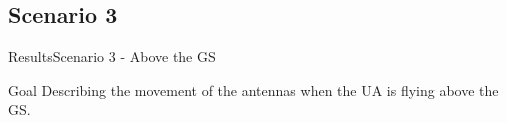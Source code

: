 \subsection{Scenario 3}

\begin{frame}{Results}{Scenario 3 - Above the GS}

  \begin{block}{Goal}
	Describing the movement of the antennas when the UA is flying above the GS.
  \end{block}

  \begin{figure}[H]
    \centerline{
    \hfill
    }
  \end{figure}

\end{frame}



